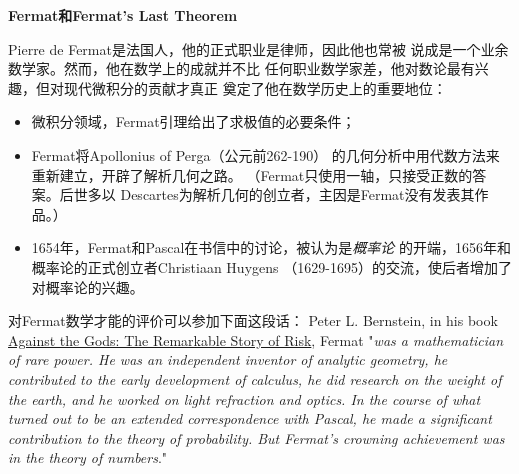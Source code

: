 \begin{shaded}
	{\bf Fermat和Fermat's Last Theorem}
	
	Pierre de Fermat是法国人，他的正式职业是律师，因此他也常被
	说成是一个{\kaishu 业余数学家}。然而，他在数学上的成就并不比
	任何职业数学家差，他对数论最有兴趣，但对现代微积分的贡献才真正
	奠定了他在数学历史上的重要地位：
	\begin{itemize}
	  \item 微积分领域，Fermat引理给出了求极值的必要条件；
	  \item Fermat将Apollonius of Perga（公元前262-190）
	  的几何分析中用代数方法来重新建立，开辟了{\kaishu 解析几何}之路。
	  （Fermat只使用一轴，只接受正数的答案。后世多以
	  Descartes为解析几何的创立者，主因是Fermat没有发表其作品。）
	  \item 1654年，Fermat和Pascal在书信中的讨论，被认为是{\it 概率论}
	  的开端，1656年和概率论的正式创立者Christiaan Huygens
	  （1629-1695）的交流，使后者增加了对概率论的兴趣。
	\end{itemize}
	对Fermat数学才能的评价可以参加下面这段话：
	Peter L. Bernstein, in his book 
	\href{https://www.amazon.com/Against-Gods-Remarkable-Story-Risk/dp/0471295639}
	{Against the Gods: The Remarkable Story of Risk}, 
	Fermat "{\it was a mathematician of rare power. He was an 
	independent inventor of analytic geometry, he contributed 
	to the early development of calculus, he did research on 
	the weight of the earth, and he worked on light refraction 
	and optics. In the course of what turned out to be an extended 
	correspondence with Pascal, he made a significant contribution 
	to the theory of probability. But Fermat's crowning achievement 
	was in the theory of numbers}."
	

\end{shaded}
